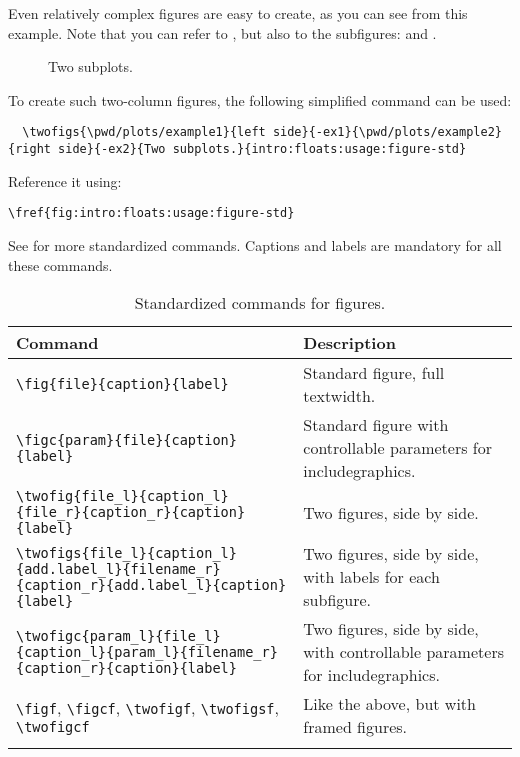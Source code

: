 


Even relatively complex figures are easy to create, as you can see from this example. Note that you can refer to , but also to the subfigures:  and .
\begin{figure}
  \centering
   \hfill
  \caption{Two subplots.}
  \label{fig:intro:floats:usage:figure}
\end{figure}

\noindent To create such two-column figures, the following simplified command can be used:
{
\scriptsize
\begin{verbatim}
  \twofigs{\pwd/plots/example1}{left side}{-ex1}{\pwd/plots/example2}{right side}{-ex2}{Two subplots.}{intro:floats:usage:figure-std}
\end{verbatim}
}
\noindent Reference it using:
\begin{verbatim}
\fref{fig:intro:floats:usage:figure-std}
\end{verbatim}

\noindent See  for more standardized commands. Captions and labels are mandatory for all these commands.
\begin{longtable}{>{\tiny}l|>{\tiny}p{}}
  \normalsize\textbf{Command} & \normalsize\textbf{Description} \\\hline
  \verb|\fig{file}{caption}{label}| & Standard figure, full textwidth. \\\hline
  \verb|\figc{param}{file}{caption}{label}| & Standard figure with controllable parameters for includegraphics. \\\hline
  \verb|\twofig{file_l}{caption_l}{file_r}{caption_r}{caption}{label}| & Two figures, side by side. \\\hline
  \verb|\twofigs{file_l}{caption_l}{add.label_l}{filename_r}{caption_r}{add.label_l}{caption}{label}| & Two figures, side by side, with labels for each subfigure.\\\hline
  \verb|\twofigc{param_l}{file_l}{caption_l}{param_l}{filename_r}{caption_r}{caption}{label}| & Two figures, side by side, with controllable parameters for includegraphics. \\\hline
  \verb|\figf|, \verb|\figcf|, \verb|\twofigf|, \verb|\twofigsf|, \verb|\twofigcf| & Like the above, but with framed figures. \\
  \caption{Standardized commands for figures.}
  \label{tab:intro:floats:figures}
\end{longtable}



